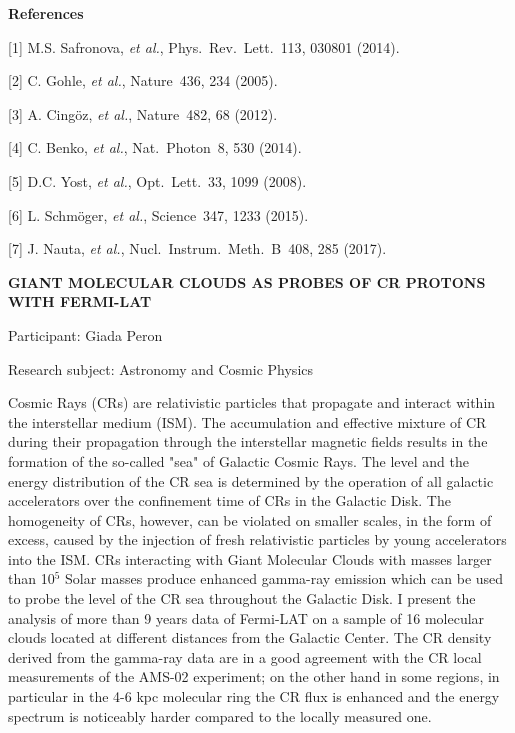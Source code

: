 \begin{minipage}[t]{1.0\textwidth}
\textbf{References}\footnotesize

[1] {M.S. Safronova, \textit{et al.}, {Phys.\ Rev.\ Lett.}\ {113}, 030801 (2014).}

[2] {C. Gohle, \textit{et al.}, {Nature}\ {436}, 234 (2005).}

[3] {A. Cingöz, \textit{et al.}, {Nature}\ {482}, 68 (2012).}

[4] {C. Benko, \textit{et al.}, {Nat.\ Photon}\ {8}, 530 (2014).}

[5] {D.C. Yost, \textit{et al.}, {Opt.\ Lett.}\	{33}, 1099 (2008).}

[6] {L. Schmöger, \textit{et al.}, {Science}\ {347}, 1233 (2015).}

[7] {J. Nauta, \textit{et al.}, {Nucl.\ Instrum.\ Meth.\ B}\ {408}, 285 (2017).}\par\end{minipage}

\hfill 

\begin{minipage}[t]{1.0\textwidth}

\begin{center}

{{\large\bfseries GIANT MOLECULAR CLOUDS AS PROBES OF CR PROTONS WITH FERMI-LAT}\par}

\end{center}

{\noindent Participant: Giada Peron\par} 

{\noindent Research subject: Astronomy and Cosmic Physics\par}\medskip

\noindent Cosmic Rays (CRs) are relativistic particles that propagate and interact within the interstellar medium (ISM). The accumulation and effective mixture of CR during their propagation through the interstellar magnetic fields results in the formation of the so-called "sea" of Galactic Cosmic Rays.  The level and the energy distribution of the CR sea is determined by the operation of all galactic accelerators over the confinement time of CRs in the Galactic Disk. The homogeneity of CRs, however, can be violated on smaller scales, in the form of excess, caused by the injection of fresh relativistic particles by young accelerators into the ISM. CRs interacting with Giant Molecular Clouds with masses larger than 10$^5$ Solar masses produce enhanced gamma-ray emission which can be used to probe the level of the CR sea throughout the Galactic Disk.
I present the analysis of more than 9 years data of Fermi-LAT on a sample of 16 molecular clouds located at different distances from the Galactic Center. The CR density derived from the gamma-ray data are in a good agreement with the CR local measurements of the AMS-02 experiment; on the other hand in some regions, in particular in the 4-6 kpc molecular ring the CR flux is enhanced and the energy spectrum is noticeably harder compared to the locally measured one.\par\end{minipage}

